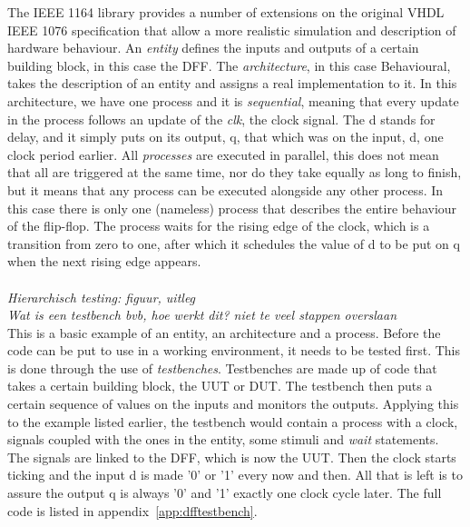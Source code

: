 \documentclass[11pt,british]{article}
\begin{document}
The \gls{IEEE} 1164 library provides a number of extensions on the original \gls{VHDL} IEEE 1076 specification that allow a more realistic simulation and description of hardware behaviour.\cite{IEEE1164} An \emph{entity} defines the inputs and outputs of a certain building block, in this case the \gls{DFF}. The \emph{architecture}, in this case Behavioural, takes the description of an entity and assigns a real implementation to it. In this architecture, we have one process and it is \emph{sequential}, meaning that every update in the process follows an update of the \emph{clk}, the clock signal. The d stands for delay, and it simply puts on its output, q, that which was on the input, d, one clock period earlier. All \emph{processes} are executed in parallel, this does not mean that all are triggered at the same time, nor do they take equally as long to finish, but it means that any process can be executed alongside any other process. In this case there is only one (nameless) process that describes the entire behaviour of the flip-flop. The process waits for the rising edge of the clock, which is a transition from zero to one, after which it schedules the value of d to be put on q when the next rising edge appears.
\\
\\
\emph{\color{red}Hierarchisch testing: figuur, uitleg}\\
\emph{\color{red}Wat is een testbench bvb, hoe werkt dit? niet te veel stappen overslaan}\\
This is a basic example of an entity, an architecture and a process. Before the code can be put to use in a working environment, it needs to be tested first. This is done through the use of \emph{testbenches}.\cite{bergeron00} Testbenches are made up of code that takes a certain building block, the \gls{UUT} or \gls{DUT}. The testbench then puts a certain sequence of values on the inputs and monitors the outputs.\cite{vhdltestbench} Applying this to the example listed earlier, the testbench would contain a process with a clock, signals coupled with the ones in the entity, some stimuli and \emph{wait} statements. The signals are linked to the DFF, which is now the UUT. Then the clock starts ticking and the input d is made '0' or '1' every now and then. All that is left is to assure the output q is always '0' and '1' exactly one clock cycle later. The full code is listed in appendix~\ref{app:dfftestbench}.
\end{document}
